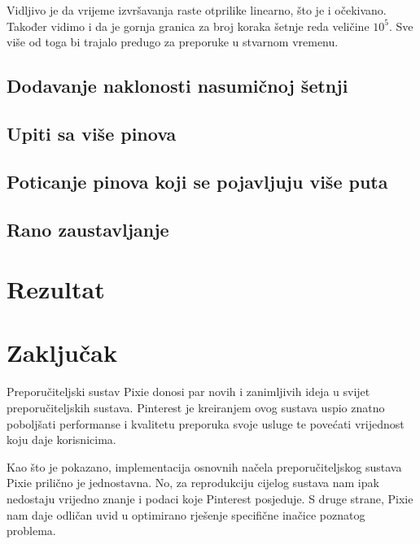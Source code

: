 \documentclass[times, utf8, seminar]{fer}
\begin{document}
Vidljivo je da vrijeme izvršavanja raste otprilike linearno, što je i očekivano. Također vidimo i da je gornja granica za broj koraka šetnje reda veličine $10^5$. Sve više od toga bi trajalo predugo za preporuke u stvarnom vremenu. 

\section{Dodavanje naklonosti nasumičnoj šetnji}

\section{Upiti sa više pinova}

\section{Poticanje pinova koji se pojavljuju više puta}

\section{Rano zaustavljanje}

\chapter{Rezultat}

\chapter{Zaključak}

Preporučiteljski sustav Pixie donosi par novih i zanimljivih ideja u svijet preporučiteljskih sustava. Pinterest je kreiranjem ovog sustava uspio znatno poboljšati performanse i kvalitetu preporuka svoje usluge te povećati vrijednost koju daje korisnicima.

Kao što je pokazano, implementacija osnovnih načela preporučiteljskog sustava Pixie prilično je jednostavna. No, za reprodukciju cijelog sustava nam ipak nedostaju vrijedno znanje i podaci koje Pinterest posjeduje. S druge strane, Pixie nam daje odličan uvid u optimirano rješenje specifične inačice poznatog problema.



\end{document}
